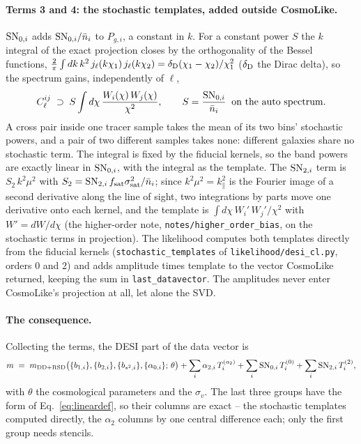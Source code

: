 \documentclass[11pt]{article}
\newcommand{\SNzi}{{\rm SN}_{0,i}}
\newcommand{\SNti}{{\rm SN}_{2,i}}
\newcommand{\us}{\_\allowbreak}
\begin{document}
\paragraph{Terms 3 and 4: the stochastic templates, added outside
CosmoLike.}
$\SNzi$ adds $\SNzi/\bar{n}_i$ to $P_{g,i}$, a constant in $k$.  For a
constant power $S$ the $k$ integral of the exact projection closes by
the orthogonality of the Bessel functions,
$\frac{2}{\pi}\int dk\, k^2\, j_\ell(k\chi_1)\, j_\ell(k\chi_2) =
\delta_{\rm D}(\chi_1 - \chi_2)/\chi_1^2$ ($\delta_{\rm D}$ the Dirac
delta), so the spectrum gains, independently of $\ell$,
\begin{equation}
  C_\ell^{ij} \;\supset\; S \int d\chi\,
  \frac{W_i(\chi)\,W_j(\chi)}{\chi^2} ,
  \qquad S = \frac{\SNzi}{\bar{n}_i} \;\;\text{on the auto spectrum} .
  \label{eq:sn0}
\end{equation}
A cross pair inside one tracer sample takes the mean of its two bins'
stochastic powers, and a pair of two different samples takes none:
different galaxies share no stochastic term.  The integral is fixed by
the fiducial kernels, so the band powers are exactly linear in
$\SNzi$, with the integral as the template.  The
$\SNti$ term is $S_2\,k^2\mu^2$ with
$S_2 = \SNti\,f_{\rm sat}\sigma_{\rm sat}^2/\bar{n}_i$; since
$k^2\mu^2 = k_\parallel^2$ is the Fourier image of a second derivative
along the line of sight, two integrations by parts move one derivative
onto each kernel, and the template is
$\int d\chi\, W_i'\,W_j'/\chi^2$ with $W' = dW/d\chi$ (the
higher-order note, \texttt{notes/higher\us order\us bias}, on the
stochastic terms in projection).  The likelihood computes
both templates directly from the fiducial kernels
(\texttt{stochastic\us templates} of
\texttt{likelihood/desi\us cl.py}, orders $0$ and $2$) and adds
amplitude times template to the vector CosmoLike returned, keeping the
sum in \texttt{last\us datavector}.  The amplitudes never enter
CosmoLike's projection at all, let alone the SVD.

\paragraph{The consequence.}
Collecting the terms, the DESI part of the data vector is
\begin{equation}
  m \;=\; m_{\rm DD+RSD}\bigl(\{b_{1,i}\},\{b_{2,i}\},\{b_{s^2,i}\},
    \{\alpha_{0,i}\};\,\theta\bigr)
  + \sum_i \alpha_{2,i}\,T^{(a_2)}_i
  + \sum_i \SNzi\,T^{(0)}_i
  + \sum_i \SNti\,T^{(2)}_i ,
  \label{eq:split}
\end{equation}
with $\theta$ the cosmological parameters and the $\sigma_v$.  The
last three groups have the form of Eq.~\eqref{eq:lineardef}, so their
columns are exact -- the stochastic templates computed directly, the
$\alpha_2$ columns by one central difference each; only the first
group needs stencils.
\end{document}
